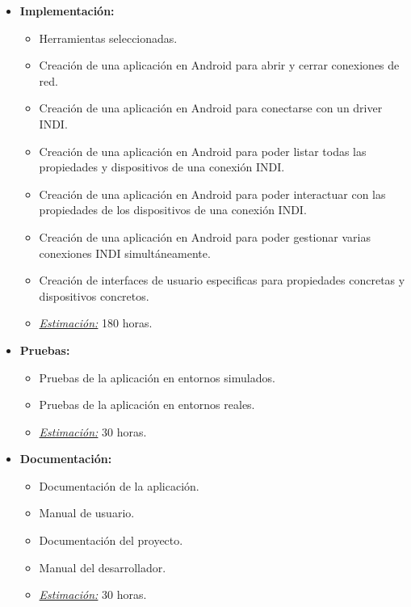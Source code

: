\begin{itemize}
 \item \textbf{Implementación:}
 \begin{itemize}
  \item Herramientas seleccionadas.
  \item Creación de una aplicación en Android para abrir y cerrar conexiones de red.
  \item Creación de una aplicación en Android para conectarse con un driver INDI.
  \item Creación de una aplicación en Android para poder listar todas las propiedades y dispositivos de una conexión INDI.
  \item Creación de una aplicación en Android para poder interactuar con las propiedades de los dispositivos de una conexión INDI.
  \item Creación de una aplicación en Android para poder gestionar varias conexiones INDI simultáneamente.
  \item Creación de interfaces de usuario especificas para propiedades concretas y dispositivos concretos.
  \item \underline{\textit{Estimación:}} 180 horas.
 \end{itemize}
\end{itemize}

\begin{itemize}
 \item \textbf{Pruebas:}
 \begin{itemize}
  \item Pruebas de la aplicación en entornos simulados.
  \item Pruebas de la aplicación en entornos reales.
  \item \underline{\textit{Estimación:}} 30 horas.
 \end{itemize}
\end{itemize}

\begin{itemize}
 \item \textbf{Documentación:}
 \begin{itemize}
  \item Documentación de la aplicación.
  \item Manual de usuario.
  \item Documentación del proyecto.
  \item Manual del desarrollador.
  \item \underline{\textit{Estimación:}} 30 horas.
 \end{itemize}
\end{itemize}

